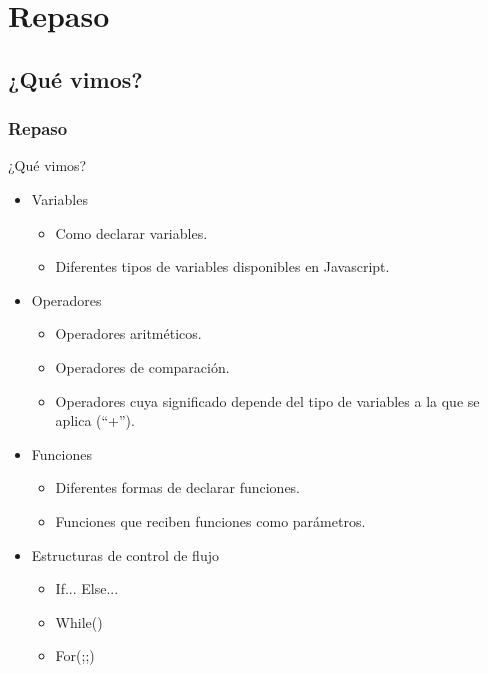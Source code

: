 \documentclass[handout, 10pt]{beamer}
\begin{document}
\section{Repaso}
\subsection{¿Qué vimos?}
\begin{frame}[fragile]
	\frametitle{Repaso}
	
	\pause ¿Qué vimos?
	
	\begin{itemize}
		\pause \item Variables
			\begin{itemize}
				\pause \item Como declarar variables.
				\pause \item Diferentes tipos de variables disponibles en Javascript.
			\end{itemize}
		
		\pause \item Operadores
			\begin{itemize}
				\pause \item Operadores aritméticos.
				\pause \item Operadores de comparación.
				\pause \item Operadores cuya significado depende del tipo de variables a la que se aplica (``+'').
			\end{itemize}
		
		\pause \item Funciones
			\begin{itemize}
				\pause \item Diferentes formas de declarar funciones.
				\pause \item Funciones que reciben funciones como parámetros.
			\end{itemize}
		
		\pause \item Estructuras de control de flujo
			\begin{itemize}
				\pause \item If... Else...
				\pause \item While(){}
				\pause \item For(;;){}
			\end{itemize}
	\end{itemize}
\end{frame}
\end{document}
